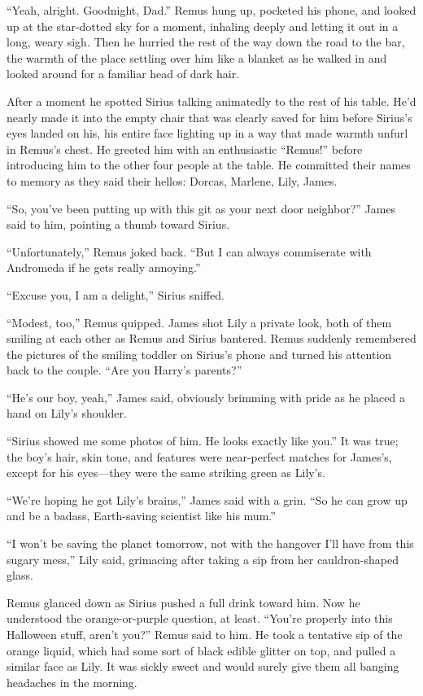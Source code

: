 “Yeah, alright. Goodnight, Dad.” Remus hung up, pocketed his phone, and looked up at the star-dotted sky for a moment, inhaling deeply and letting it out in a long, weary sigh. Then he hurried the rest of the way down the road to the bar, the warmth of the place settling over him like a blanket as he walked in and looked around for a familiar head of dark hair.

After a moment he spotted Sirius talking animatedly to the rest of his table. He’d nearly made it into the empty chair that was clearly saved for him before Sirius’s eyes landed on his, his entire face lighting up in a way that made warmth unfurl in Remus’s chest. He greeted him with an enthusiastic “Remus!” before introducing him to the other four people at the table. He committed their names to memory as they said their hellos: Dorcas, Marlene, Lily, James.

“So, you’ve been putting up with this git as your next door neighbor?” James said to him, pointing a thumb toward Sirius.

“Unfortunately,” Remus joked back. “But I can always commiserate with Andromeda if he gets really annoying.”

“Excuse you, I am a delight,” Sirius sniffed.

“Modest, too,” Remus quipped. James shot Lily a private look, both of them smiling at each other as Remus and Sirius bantered. Remus suddenly remembered the pictures of the smiling toddler on Sirius’s phone and turned his attention back to the couple. “Are you Harry’s parents?”

“He’s our boy, yeah,” James said, obviously brimming with pride as he placed a hand on Lily’s shoulder.

“Sirius showed me some photos of him. He looks exactly like you.” It was true; the boy’s hair, skin tone, and features were near-perfect matches for James’s, except for his eyes—they were the same striking green as Lily’s.

“We’re hoping he got Lily’s brains,” James said with a grin. “So he can grow up and be a badass, Earth-saving scientist like his mum.”

“I won’t be saving the planet tomorrow, not with the hangover I’ll have from this sugary mess,” Lily said, grimacing after taking a sip from her cauldron-shaped glass.

Remus glanced down as Sirius pushed a full drink toward him. Now he understood the orange-or-purple question, at least. “You’re properly into this Halloween stuff, aren’t you?” Remus said to him. He took a tentative sip of the orange liquid, which had some sort of black edible glitter on top, and pulled a similar face as Lily. It was sickly sweet and would surely give them all banging headaches in the morning.

